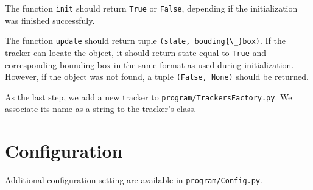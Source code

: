 The function \verb+init+ should return \verb+True+ or \verb+False+, depending
if the initialization was finished successfuly.

The function \verb+update+ should return tuple \verb+(state, bouding{\_}box)+.
If the tracker can locate the object, it should return state equal to
\verb+True+ and corresponding bounding box in the same format as used during
initialization. However, if the object was not found, a tuple \verb+(False, None)+
should be returned.

As the last step, we add a new tracker to \verb+program/TrackersFactory.py+.
We associate its name as a string to the tracker's class. 

\section{Configuration}

Additional configuration setting are available in \verb+program/Config.py+.
